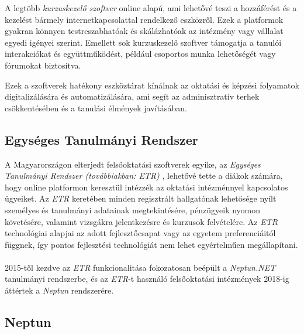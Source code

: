A legtöbb \textit{kurzuskezelő szoftver} online alapú, ami lehetővé teszi a hozzáférést és a kezelést bármely internetkapcsolattal rendelkező eszközről. Ezek a platformok gyakran könnyen testreszabhatóak és skálázhatóak az intézmény vagy vállalat egyedi igényei szerint. Emellett sok kurzuskezelő szoftver támogatja a tanulói interakciókat és együttműködést, például csoportos munka lehetőségét vagy fórumokat biztosítva.

Ezek a szoftverek hatékony eszköztárat kínálnak az oktatási és képzési folyamatok digitalizálására és automatizálására, ami segít az adminisztratív terhek csökkentésében és a tanulási élmények javításában.

\subsection{Egységes Tanulmányi Rendszer}

A Magyarországon elterjedt felsőoktatási szoftverek egyike, az \textit{Egységes Tanulmányi Rendszer (továbbiakban: ETR)} \cite{etr}, lehetővé tette a diákok számára, hogy online platformon keresztül intézzék az oktatási intézménnyel kapcsolatos ügyeiket. Az \textit{ETR} keretében minden regisztrált hallgatónak lehetősége nyílt személyes és tanulmányi adatainak megtekintésére, pénzügyeik nyomon követésére, valamint vizsgákra jelentkezésre és kurzusok felvételére. Az \textit{ETR} technológiai alapjai az adott fejlesztőcsapat vagy az egyetem preferenciáitól függnek, így pontos fejlesztési technológiát nem lehet egyértelműen megállapítani.\\
\\
2015-től kezdve az \textit{ETR} funkcionalitása fokozatosan beépült a \textit{Neptun.NET} \cite{neptun} tanulmányi rendszerbe, és az \textit{ETR}-t használó felsőoktatási intézmények 2018-ig áttértek a \textit{Neptun} rendszerére.

\subsection{Neptun}

